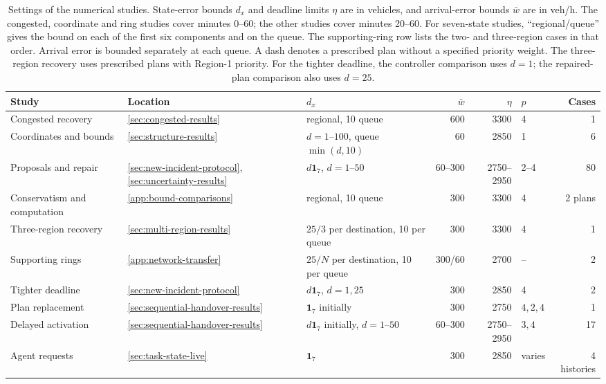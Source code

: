 \documentclass[final]{cas-sc}
\theoremstyle{definition}
\theoremstyle{plain}
\theoremstyle{definition}
\theoremstyle{plain}
\begin{document}
\begin{table}[pos=!htb]
\centering\footnotesize
\caption{Settings of the numerical studies. State-error bounds $d_x$ and
deadline limits $\eta$ are in vehicles, and arrival-error bounds $\bar w$
are in veh/h. The congested, coordinate and ring studies cover minutes
0--60; the other studies cover minutes 20--60. For seven-state studies,
``regional/queue'' gives the bound on each of the first six components
and on the queue. The supporting-ring row lists the two- and
three-region cases in that order. Arrival error is bounded separately
at each queue. A dash denotes a prescribed plan without a specified
priority weight. The three-region recovery uses prescribed plans with
Region-1 priority.
For the tighter deadline, the controller comparison uses $d=1$;
the repaired-plan comparison also uses $d=25$.}
\label{tab:study-overview}
\setlength{\tabcolsep}{3pt}
\begin{tabularx}{\linewidth}{@{}>{\raggedright\arraybackslash}p{2.6cm}l>{\raggedright\arraybackslash}Xrrlr@{}}
\toprule
Study & Location & $d_x$ & $\bar w$ & $\eta$ & $p$ & Cases\\
\midrule
Congested recovery & \ref{sec:congested-results} & 25 regional, 10 queue & 600 & 3300 & 4 & 1\\
Coordinates and bounds & \ref{sec:structure-results} & $d=1$--$100$, queue $\min(d,10)$ & 60 & 2850 & 1 & 6\\
Proposals and repair & \ref{sec:new-incident-protocol}, \ref{sec:uncertainty-results} & $d\mathbf1_7$, $d=1$--$50$ & 60--300 & 2750--2950 & 2--4 & 80\\
Conservatism and computation & \ref{app:bound-comparisons} & 25 regional, 10 queue & 300 & 3300 & 4 & 2 plans\\
Three-region recovery & \ref{sec:multi-region-results} & $25/3$ per destination, 10 per queue & 300 & 3300 & 4 & 1\\
Supporting rings & \ref{app:network-transfer} & $25/N$ per destination, 10 per queue & 300/60 & 2700 & -- & 2\\
Tighter deadline & \ref{sec:new-incident-protocol} & $d\mathbf1_7$, $d=1,25$ & 300 & 2850 & 4 & 2\\
Plan replacement & \ref{sec:sequential-handover-results} & $\mathbf1_7$ initially & 300 & 2750 & $4,2,4$ & 1\\
Delayed activation & \ref{sec:sequential-handover-results} & $d\mathbf1_7$ initially, $d=1$--$50$ & 60--300 & 2750--2950 & $3,4$ & 17\\
Agent requests & \ref{sec:task-state-live} & $\mathbf1_7$ & 300 & 2850 & varies & 4 histories\\
\bottomrule
\end{tabularx}
\end{table}
\end{document}
